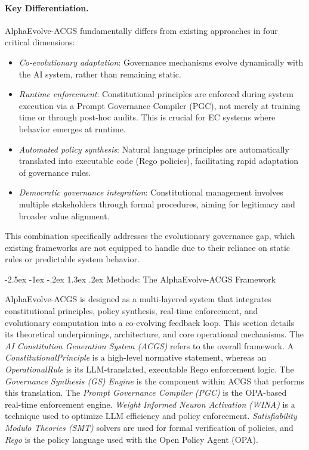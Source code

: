 \documentclass[manuscript,screen,9pt]{acmart}
\makeatletter
\renewcommand\section{\@startsection{section}{1}{\z@}%
  {-2.5ex \@plus -1ex \@minus -.2ex}%
  {1.3ex \@plus.2ex}%
  {\normalfont\Large\bfseries}}
\makeatother
\begin{document}
\paragraph{Key Differentiation.} AlphaEvolve-ACGS fundamentally differs from existing approaches in four critical dimensions:
\begin{itemize}[leftmargin=*,itemsep=1pt,parsep=1pt]
    \item \textit{Co-evolutionary adaptation}: Governance mechanisms evolve dynamically with the AI system, rather than remaining static.
    \item \textit{Runtime enforcement}: Constitutional principles are enforced during system execution via a Prompt Governance Compiler (PGC), not merely at training time or through post-hoc audits. This is crucial for EC systems where behavior emerges at runtime.
    \item \textit{Automated policy synthesis}: Natural language principles are automatically translated into executable code (Rego policies), facilitating rapid adaptation of governance rules.
    \item \textit{Democratic governance integration}: Constitutional management involves multiple stakeholders through formal procedures, aiming for legitimacy and broader value alignment.
\end{itemize}
This combination specifically addresses the evolutionary governance gap, which existing frameworks are not equipped to handle due to their reliance on static rules or predictable system behavior.

\section{Methods: The AlphaEvolve-ACGS Framework}
\label{sec:methods}

AlphaEvolve-ACGS is designed as a multi-layered system that integrates constitutional principles, policy synthesis, real-time enforcement, and evolutionary computation into a co-evolving feedback loop. This section details its theoretical underpinnings, architecture, and core operational mechanisms. The \textit{AI Constitution Generation System (ACGS)} refers to the overall framework. A \textit{ConstitutionalPrinciple} is a high-level normative statement, whereas an \textit{OperationalRule} is its LLM-translated, executable Rego enforcement logic. The \textit{Governance Synthesis (GS) Engine} is the component within ACGS that performs this translation. The \textit{Prompt Governance Compiler (PGC)} is the OPA-based real-time enforcement engine. \textit{Weight Informed Neuron Activation (WINA)} \cite{WINA2024NeuronActivation} is a technique used to optimize LLM efficiency and policy enforcement. \textit{Satisfiability Modulo Theories (SMT)} solvers are used for formal verification of policies, and \textit{Rego} is the policy language used with the Open Policy Agent (OPA).
\end{document}
